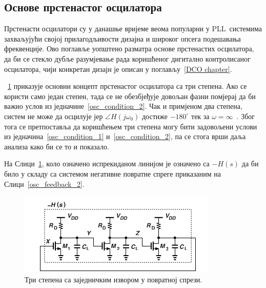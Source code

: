 \documentclass[master]{finthesis}
\def \PLL  {PLL} %
\begin{document}
\subsection{Основе прстенастог осцилатора}
Прстенасти осцилатори су у данашње вријеме веома популарни у \PLL\ системима захваљујући својој прилагодљивости дизајна и широког опсега подешавања фреквенције. Ово поглавље уопштено разматра основе прстенастих осцилатора, да би се стекло дубље разумјевање рада коришћеног дигитално контролисаног осцилатора, чији конкретан дизајн је описан у поглављу~\ref{DCO chapter}. \par
\figurename~\ref{ring_osc_1} приказује основни концепт прстенастог осцилатора са три степена. Ако се користи само један степен, тада се не обезбјеђује довољан фазни помјерај да би важио услов из једначине~\ref{osc_condition_2}. Чак и примјеном два степена, систем не може да осцилује јер $\angle H(j\omega_{0})$ достиже $-180^{\circ}$ тек за $\omega=\infty$~\cite{Razavi:PLL_CMOS_2020}. Због тога се претпоставља да коришћењем три степена могу бити задовољени услови из једначина~\ref{osc_condition_1} и~\ref{osc_condition_2}, па се стога врши даља анализа како би се то и показало. \par 
На Слици~\ref{ring_osc_1}, коло означено испрекиданом линијом је означено са $-H(s)$ да би било у складу са системом негативне повратне спреге приказаним на Слици~\ref{osc_feedback_2}. \par
\begin{figure}[!ht]
	 \centering
	 \includegraphics[scale=0.8]{slike/ring_osc_1.png}
	 \caption{Три степена са заједничким извором у повратној спрези.}
	 \label{ring_osc_1}
\end{figure}
\end{document}
